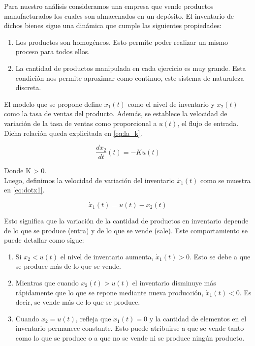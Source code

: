 \documentclass{sig-alternate}
\begin{document}
Para nuestro análisis consideramos una empresa que vende productos manufacturados los cuales son almacenados en un depósito.
El inventario de dichos bienes sigue una dinámica que cumple las siguientes propiedades:
\begin{enumerate}
\item Los productos son homogéneos. Esto permite poder realizar un mismo proceso para todos ellos.
\item La cantidad de productos manipulada en cada ejercicio es muy grande. Esta condición nos permite aproximar como continuo, este sistema de
naturaleza discreta.
\end{enumerate}
El modelo que se propone define $x_{1}(t)$ como el nivel
de inventario y $x_{2}(t)$ como la tasa de ventas del producto. Además,
se establece la velocidad de variación de la tasa de ventas como proporcional a $u(t)$, el flujo de entrada. Dicha relación queda explicitada en
\eqref{eq:la_k}.

\begin{equation}
\frac{dx_{2}}{dt}(t)=-Ku(t)\label{eq:la_k}\end{equation}


Donde K > 0.\\
Luego, definimos la velocidad de variación del inventario $\dot{x_{1}}(t)$ como se muestra en \eqref{eq:dotx1}.

\begin{equation}
\dot{x}_{1}(t)=u(t)-x_{2}(t)\label{eq:dotx1}\end{equation}

Esto significa que la variación de la cantidad de productos en inventario depende de lo
que se produce (entra) y de lo que se vende (sale). Este comportamiento se puede detallar como sigue:
\begin{enumerate}
\item Si $x_{2}<u(t)$ el nivel de inventario aumenta, $\dot{x}_{1}(t)>0$.
Esto se debe a que se produce más de lo que se vende.
\item Mientras que cuando $x_{2}(t)>u(t)$ el inventario disminuye más rápidamente que lo que se repone mediante nueva producción, 
$\dot{x}_{1}(t)<0$. Es decir, se vende más de lo que se produce.
\item Cuando $x_{2}=u(t)$, refleja que $\dot{x}_{1}(t)=0$ y la cantidad de
elementos en el inventario permanece constante. Esto puede atribuirse
a que se vende tanto como lo que se produce o a que no se vende ni
se produce ningún producto.

\end{enumerate}
\end{document}
